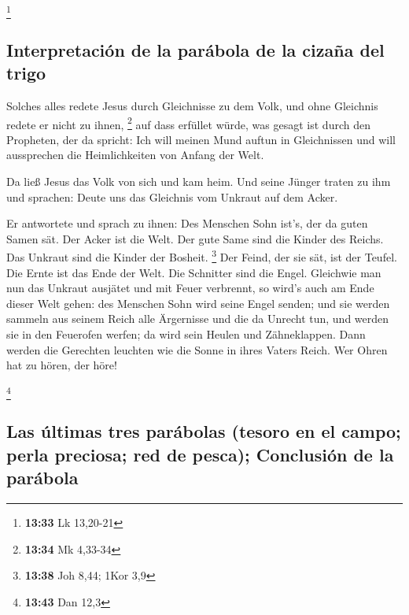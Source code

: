 \footnote{\textbf{13:33} Lk 13,20-21}

\hypertarget{interpretaciuxf3n-de-la-paruxe1bola-de-la-cizauxf1a-del-trigo}{%
\subsection{Interpretación de la parábola de la cizaña del
trigo}\label{interpretaciuxf3n-de-la-paruxe1bola-de-la-cizauxf1a-del-trigo}}

 Solches alles redete Jesus durch Gleichnisse zu dem
Volk, und ohne Gleichnis redete er nicht zu ihnen, \footnote{\textbf{13:34}
  Mk 4,33-34}  auf dass erfüllet würde, was gesagt ist
durch den Propheten, der da spricht: Ich will meinen Mund auftun in
Gleichnissen und will aussprechen die Heimlichkeiten von Anfang der
Welt.

 Da ließ Jesus das Volk von sich und kam heim. Und seine
Jünger traten zu ihm und sprachen: Deute uns das Gleichnis vom Unkraut
auf dem Acker.

 Er antwortete und sprach zu ihnen: Des Menschen Sohn
ist's, der da guten Samen sät.  Der Acker ist die Welt.
Der gute Same sind die Kinder des Reichs. Das Unkraut sind die Kinder
der Bosheit. \footnote{\textbf{13:38} Joh 8,44; 1Kor 3,9}
 Der Feind, der sie sät, ist der Teufel. Die Ernte ist
das Ende der Welt. Die Schnitter sind die Engel. 
Gleichwie man nun das Unkraut ausjätet und mit Feuer verbrennt, so
wird's auch am Ende dieser Welt gehen:  des Menschen Sohn
wird seine Engel senden; und sie werden sammeln aus seinem Reich alle
Ärgernisse und die da Unrecht tun,  und werden sie in den
Feuerofen werfen; da wird sein Heulen und Zähneklappen. 
Dann werden die Gerechten leuchten wie die Sonne in ihres Vaters Reich.
Wer Ohren hat zu hören, der höre!

\footnote{\textbf{13:43} Dan 12,3}

\hypertarget{las-uxfaltimas-tres-paruxe1bolas-tesoro-en-el-campo-perla-preciosa-red-de-pesca-conclusiuxf3n-de-la-paruxe1bola}{%
\subsection{Las últimas tres parábolas (tesoro en el campo; perla
preciosa; red de pesca); Conclusión de la
parábola}\label{las-uxfaltimas-tres-paruxe1bolas-tesoro-en-el-campo-perla-preciosa-red-de-pesca-conclusiuxf3n-de-la-paruxe1bola}}

